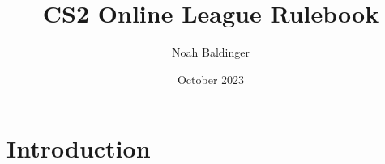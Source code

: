 \documentclass{article}
\title{CS2 Online League Rulebook}
\author{Noah Baldinger}
\date{October 2023}
\begin{document}
\maketitle

\section{Introduction}
\end{document}
